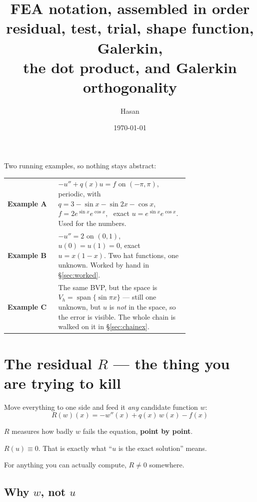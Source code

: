 \documentclass[11pt]{article}
\title{\bfseries FEA notation, assembled in order\\[0.35em]
  \large residual, test, trial, shape function, Galerkin,\\
  the dot product, and Galerkin orthogonality}
\author{Hasan}
\date{\today}
\begin{document}
\maketitle
\thispagestyle{fancy}

\noindent
Two running examples, so nothing stays abstract:

\begin{center}\small
\renewcommand{\arraystretch}{1.4}
\begin{tabular}{@{}l>{\raggedright\arraybackslash}p{0.72\linewidth}@{}}
\toprule
\textbf{Example A} & $-u''+q(x)u=f$ on $(-\pi,\pi)$, periodic, with
  $q=3-\sin x-\sin 2x-\cos x$, \ $f=2e^{\sin x}e^{\cos x}$, \
  exact $u=e^{\sin x}e^{\cos x}$. Used for the numbers.\\
\textbf{Example B} & $-u''=2$ on $(0,1)$, $u(0)=u(1)=0$, exact $u=x(1-x)$.
  Two hat functions, one unknown. Worked by hand in \S\ref{sec:worked}.\\
\textbf{Example C} & The same BVP, but the space is
  $V_h=\operatorname{span}\{\sin\pi x\}$ --- still one unknown, but $u$ is
  \emph{not} in the space, so the error is visible. The whole chain is walked
  on it in \S\ref{sec:chainex}.\\
\bottomrule
\end{tabular}
\end{center}

\section{The residual $R$ --- the thing you are trying to kill}

Move everything to one side and feed it \emph{any} candidate function $w$:
\[
  \boxed{\;R(w)(x)=-w''(x)+q(x)\,w(x)-f(x)\;}
\]

\begin{pts}
\item $R$ measures how badly $w$ fails the equation, \textbf{point by point}.
\item $R(u)\equiv0$. That is exactly what ``$u$ is the exact solution'' means.
\item For anything you can actually compute, $R\neq0$ somewhere.
\end{pts}

\subsection*{Why $w$, not $u$}
\end{document}
